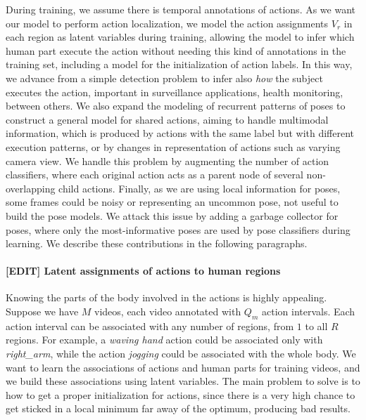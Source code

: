 During training, we assume there is temporal annotations of actions. As we want our model to perform action localization, we model the action assignments $V_r$ in each region as latent variables during training, allowing the model to infer which human part execute the action without needing this kind of annotations in the training set, including a model for the initialization of action labels. In this way, we advance from a simple detection problem to infer also \emph{how} the subject executes the action, important in surveillance applications, health monitoring, between others. We also expand the modeling of recurrent patterns of poses to construct a general model for shared actions, aiming to handle multimodal information, which is produced by actions with the same label but with different execution patterns, or by changes in representation of actions such as varying camera view. We handle this problem by augmenting the number of action classifiers, where each original action acts as a parent node of several non-overlapping child actions. Finally, as we are using local information for poses, some frames could be noisy or representing an uncommon pose, not useful to build the pose models. We attack this issue by adding a garbage collector for poses, where only the most-informative poses are used by pose classifiers during learning. We describe these contributions in the following paragraphs.

\paragraph{[EDIT] Latent assignments of actions to human regions}

Knowing the parts of the body involved in the actions is highly appealing. Suppose we have $M$ videos, each video annotated with $Q_m$ action intervals. Each action interval can be associated with any number of regions, from $1$ to all $R$ regions. For example,  a \emph{waving hand} action could be associated only with \emph{right\_arm}, while the action \emph{jogging} could be associated with the whole body. We want to learn the associations of actions and human parts for training videos, and we build these associations using latent variables. The main problem to solve is to how to get a proper initialization for actions, since there is a very high chance to get sticked in a local minimum far away of the optimum, producing bad results.

